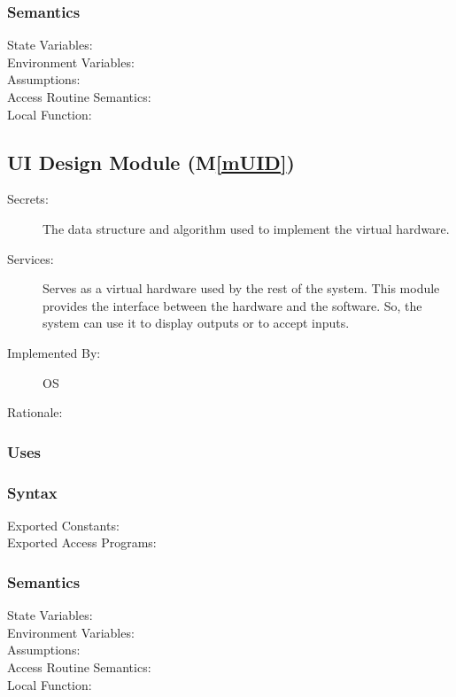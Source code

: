 \documentclass[12pt, titlepage]{article}
\newcommand{\mref}[1]{M\ref{#1}}
\begin{document}
\begin{description}
\begin{description}
\subsubsection{Semantics}
\begin{description}
  \item[State Variables:]
  \item[Environment Variables:]  
  \item[Assumptions:] 
  \item[Access Routine Semantics:] 
  \item[Local Function:] 
\end{description}

\subsection{UI Design Module (\mref{mUID})}
\begin{description}
  \item[Secrets:]The data structure and algorithm used to implement the virtual
    hardware.
  \item[Services:]Serves as a virtual hardware used by the rest of the
    system. This module provides the interface between the hardware and the
    software. So, the system can use it to display outputs or to accept inputs.
  \item[Implemented By:] OS
  \item[Rationale:] 
\end{description}

\subsubsection{Uses}

\subsubsection{Syntax}
\begin{description}
  \item[Exported Constants:] 
  \item[Exported Access Programs:] 
\end{description}

\subsubsection{Semantics}
\begin{description}
  \item[State Variables:]
  \item[Environment Variables:]  
  \item[Assumptions:] 
  \item[Access Routine Semantics:] 
  \item[Local Function:] 
\end{description}


\end{description}
\end{description}
\end{document}
